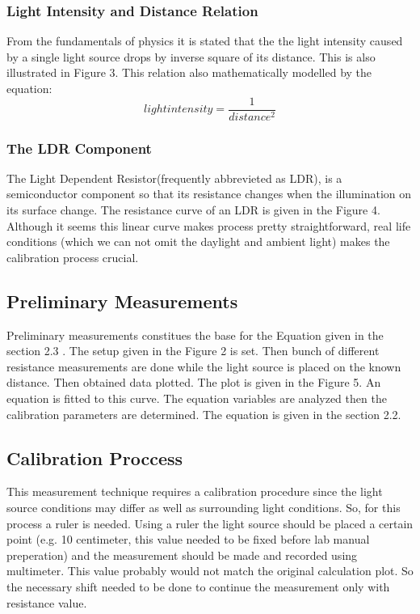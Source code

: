 \documentclass[letterpaper,12pt]{article}
\begin{document}
\subsubsection{Light Intensity and Distance Relation}
From the fundamentals of physics it is stated that the the light intensity caused by a single light source drops by inverse square of its distance. This is also illustrated in Figure 3.
This relation also mathematically modelled by the equation:
\[light intensity  = \frac{1}{distance^2}\]
\subsubsection{The LDR Component}
The Light Dependent Resistor(frequently abbrevieted as LDR), is a semiconductor component so that its  resistance changes when the illumination on its surface change. The resistance curve of an LDR is given in the Figure 4.
Although it seems this linear curve makes process pretty straightforward, real life conditions (which we can not omit the daylight and ambient light) makes the calibration process crucial.
\subsection{Preliminary Measurements}
Preliminary measurements constitues the base for the Equation given in the  section 2.3 . The setup given in the Figure 2 is set. Then bunch of different resistance measurements are done while the light source is placed on the known distance. Then obtained data plotted. The plot is given in the Figure 5.
An equation is fitted to this curve. The equation variables are analyzed then the calibration parameters are determined. The equation is given in the section 2.2. 
\subsection{Calibration Proccess}
This measurement technique requires a calibration procedure since the light source conditions may differ as well as surrounding light conditions. So, for this process a ruler is needed. Using a ruler the light source should be placed a certain point (e.g. 10 centimeter, this value needed to be fixed before lab manual preperation) and the measurement should be made and recorded using multimeter. This value probably would not match the original calculation plot. So the necessary shift needed to be done to continue the measurement only with resistance value.
\end{document}
